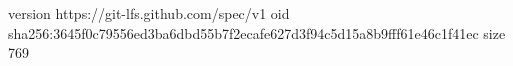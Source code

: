 version https://git-lfs.github.com/spec/v1
oid sha256:3645f0c79556ed3ba6dbd55b7f2ecafe627d3f94c5d15a8b9fff61e46c1f41ec
size 769
